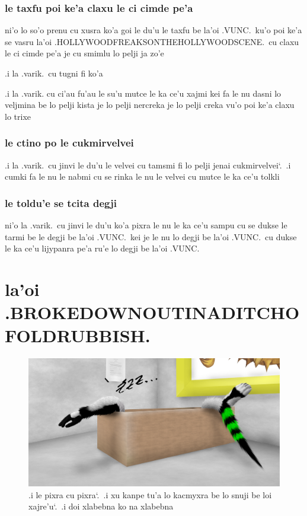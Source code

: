 \documentclass{report}
\newcommand\sds{\spacefactor\sfcode`.\ \space}
\begin{document}
\subsection{le taxfu poi ke'a claxu le ci cimde pe'a}
ni'o lo so'o prenu cu xusra ko'a goi le du'u le taxfu be la'oi .VUNC.\ ku'o poi ke'a se vasru la'oi .HOLLYWOODFREAKSONTHEHOLLYWOODSCENE.\ cu claxu le ci cimde pe'a je cu smimlu lo pelji ja zo'e

.i la .varik.\ cu tugni fi ko'a

.i la .varik. cu ci'au fu'au le su'u mutce le ka ce'u xajmi kei fa le nu dasni lo veljmina be lo pelji kista je lo pelji nercreka je lo pelji creka vu'o poi ke'a claxu lo trixe

\subsection{le ctino po le cukmirvelvei}
.i la .varik.\ cu jinvi le du'u le velvei cu tamsmi fi lo pelji jenai cukmirvelvei\sds  .i cumki fa le nu le nabmi cu se rinka le nu le velvei cu mutce le ka ce'u tolkli

\subsection{le toldu'e se tcita degji}
ni'o la .varik.\ cu jinvi le du'u ko'a pixra le nu le ka ce'u sampu cu se dukse le tarmi be le degji be la'oi .VUNC.\ kei je le nu lo degji be la'oi .VUNC.\ cu dukse le ka ce'u lijypanra pe'a ru'e lo degji be la'oi .VUNC.

\chapter{la'oi .BROKEDOWNOUTINADITCHOFOLDRUBBISH.}
\begin{figure}[ht]
	\centering
	\includegraphics[width=\textwidth]{brokedownoutinaditchofoldrubbish/brokedownoutinaditchofoldrubbish.png}
	\caption[center]{.i le pixra cu pixra\sds  .i xu kanpe tu'a lo kacmyxra be lo snuji be loi xajre'u\sds  .i doi xlabebna ko na xlabebna}
\end{figure}
\end{document}
